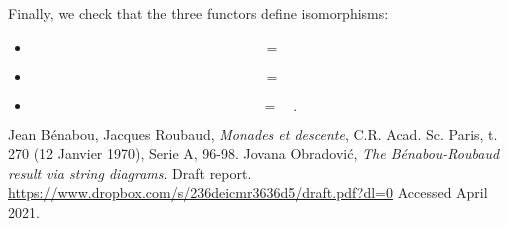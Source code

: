 \documentclass{amsart}
\begin{document}
    Finally, we check that the three functors define isomorphisms:
    \begin{itemize}
    \item 
    \[
        
        \quad=\quad
        
    \]
    \item
    \[
        
        \quad=\quad
        
    \]
    \item
    \[
        
        \quad=\quad
        
        .
    \]
    \end{itemize}
\begin{thebibliography}{9}
    Jean B\'enabou, Jacques Roubaud, \textit{Monades et descente},
    C.R. Acad. Sc. Paris, t. 270 (12 Janvier 1970), Serie A, 96-98.
    Jovana Obradovi\'c, \textit{The B\'enabou-Roubaud result via string diagrams}.
    Draft report.
    \url{https://www.dropbox.com/s/236deicmr3636d5/draft.pdf?dl=0}
    Accessed April 2021.
\end{thebibliography}
\end{document}
